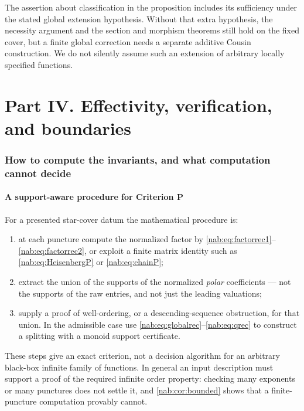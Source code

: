\documentclass[11pt,letterpaper]{article}
\theoremstyle{definition}
\theoremstyle{remark}
\numberwithin{equation}{section}
\begin{document}
The assertion about classification in the proposition includes its sufficiency
under the stated global extension hypothesis. Without that extra hypothesis,
the necessity argument and the section and morphism theorems still hold on the
fixed cover, but a finite global correction needs a separate additive Cousin
construction. We do not silently assume such an extension of arbitrary locally
specified functions.

\part*{Part IV. Effectivity, verification, and boundaries}

\section{How to compute the invariants, and what computation cannot decide}
\label{nab:sec:effectivity}

\subsection{A support-aware procedure for Criterion P}

For a presented star-cover datum the mathematical procedure is:
\begin{enumerate}
\item at each puncture compute the normalized factor by
\eqref{nab:eq:factorrec1}--\eqref{nab:eq:factorrec2}, or exploit a finite
matrix identity such as \eqref{nab:eq:HeisenbergP} or
\eqref{nab:eq:chainP};
\item extract the union of the supports of the normalized \emph{polar}
coefficients --- not the supports of the raw entries, and not just the leading
valuations;
\item supply a proof of well-ordering, or a descending-sequence obstruction,
for that union. In the admissible case use
\eqref{nab:eq:globalrec}--\eqref{nab:eq:qrec} to construct a splitting with a
monoid support certificate.
\end{enumerate}
These steps give an exact criterion, not a decision algorithm for an arbitrary
black-box infinite family of functions. In general an input description must
support a proof of the required infinite order property: checking many
exponents or many punctures does not settle it, and \cref{nab:cor:bounded}
shows that a finite-puncture computation provably cannot.
\end{document}
